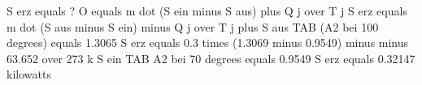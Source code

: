 S erz equals ?  
O equals m dot (S ein minus S aus) plus Q j over T j  
S erz equals m dot (S aus minus S ein) minus Q j over T j plus S aus TAB (A2 bei 100 degrees) equals 1.3065  
S erz equals 0.3 times (1.3069 minus 0.9549) minus minus 63.652 over 273 k  
S ein TAB A2 bei 70 degrees equals 0.9549  
S erz equals 0.32147 kilowatts